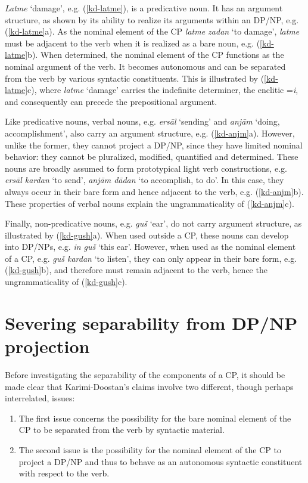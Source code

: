 \documentclass[output=paper]{langsci/langscibook}
\begin{document}
\textit{Latme} `damage', e.g. (\ref{kd-latme}), is a predicative noun. It has an argument structure, as shown by its ability to realize its arguments within an DP/NP, e.g. (\ref{kd-latme}a). As the nominal element of the CP \textit{latme zadan} `to damage', \textit{latme} must be adjacent to the verb when it is realized as a bare noun, e.g. (\ref{kd-latme}b). When determined, the nominal element of the CP functions as the nominal argument of the verb. It becomes autonomous and can be separated from the verb by various syntactic constituents. This is illustrated by (\ref{kd-latme}c),  where \textit{latme} `damage' carries the indefinite determiner, the enclitic =\textit{i}, and consequently can precede the prepositional argument.\largerpage[2]

Like predicative nouns, verbal nouns, e.g. \textit{ers\=al} `sending' and \textit{anj\=am} `doing, accomplishment', also carry an argument structure, e.g. (\ref{kd-anjm}a). However, unlike the former, they cannot project a DP/NP, since they have limited nominal behavior: they cannot be pluralized, modified, quantified and determined.  
These nouns are broadly assumed to form prototypical light verb constructions, e.g. \textit{ers\=al kardan} `to send', \textit{anj\=am d\=adan} `to accomplish, to do'. In this case, they always occur in their bare form and hence adjacent to the verb, e.g. (\ref{kd-anjm}b). These properties of verbal nouns explain the ungrammaticality of (\ref{kd-anjm}c).

Finally, non-predicative nouns, e.g. \textit{gu\v{s}} `ear', do not carry argument structure, as illustrated by (\ref{kd-gush}a). When used outside a CP, these nouns can develop into DP/NPs, e.g. \textit{in gu\v{s}} `this ear'. However, when used as the nominal element of a CP, e.g. \textit{gu\v{s} kardan} `to listen', they can only appear in their bare form, e.g. (\ref{kd-gush}b), and therefore must remain adjacent to the verb, hence the ungrammaticality of (\ref{kd-gush}c).


\section{Severing separability from DP/NP projection}\label{Sec:Severing}\largerpage

Before investigating the separability of the components of a CP, it should be made clear that Karimi-Doostan's claims involve two different, though perhaps interrelated, issues:

\begin{enumerate}\label{claim-2}
	\item The first issue concerns the possibility for the bare nominal element of the CP to be separated from the verb by syntactic material. 
	\item
          \begin{sloppypar}
            The second issue is the possibility for the nominal
            element of the CP to project a DP/NP and thus to behave as
            an autonomous syntactic constituent with respect to the
            verb.
          \end{sloppypar}

\end{enumerate}
\end{document}
